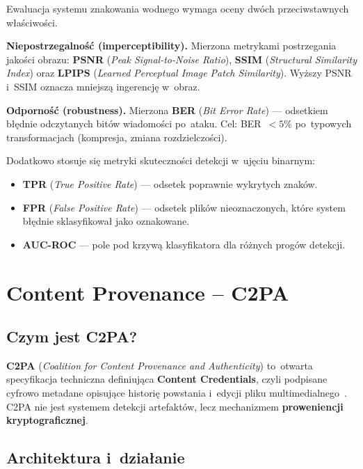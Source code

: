 Ewaluacja systemu znakowania wodnego wymaga oceny
dwóch przeciwstawnych w\l{}a\'{s}ciwo\'{s}ci.

\textbf{Niepostrzegalno\'{s}\'{c} (imperceptibility).}
Mierzona metrykami postrzegania jako\'{s}ci obrazu:
\textbf{PSNR} (\textit{Peak Signal-to-Noise Ratio}),
\textbf{SSIM} (\textit{Structural Similarity Index})
oraz \textbf{LPIPS} (\textit{Learned Perceptual Image Patch Similarity}).
Wy\.{z}szy PSNR i~SSIM oznacza mniejsz\k{a} ingerencj\k{e} w~obraz.

\textbf{Odporno\'{s}\'{c} (robustness).}
Mierzona \textbf{BER} (\textit{Bit Error Rate}) ---
odsetkiem b\l{}\k{e}dnie odczytanych bit\'{o}w wiadomo\'{s}ci po~ataku.
Cel: BER~$< 5\%$ po~typowych transformacjach
(kompresja, zmiana rozdzielczo\'{s}ci).

Dodatkowo stosuje si\k{e} metryki skuteczno\'{s}ci detekcji
w~uj\k{e}ciu binarnym:
\begin{itemize}
  \item \textbf{TPR} (\textit{True Positive Rate}) ---
        odsetek poprawnie wykrytych znak\'{o}w.
  \item \textbf{FPR} (\textit{False Positive Rate}) ---
        odsetek plik\'{o}w nieoznaczonych, kt\'{o}re system
        b\l{}\k{e}dnie sklasyfikowa\l{} jako oznakowane.
  \item \textbf{AUC-ROC} ---
        pole pod krzyw\k{a} klasyfikatora dla r\'{o}\.{z}nych
        prog\'{o}w detekcji.
\end{itemize}

\section{Content Provenance -- C2PA}
\label{sec:c2pa}

\subsection{Czym jest C2PA?}
\label{sec:c2pa_opis}

\textbf{C2PA} (\textit{Coalition for Content Provenance and Authenticity})
to~otwarta specyfikacja techniczna definiuj\k{a}ca
\textbf{Content Credentials}, czyli podpisane cyfrowo metadane opisuj\k{a}ce
histori\k{e} powstania i~edycji pliku multimedialnego~\cite{C2PA2024Spec}.
C2PA nie jest systemem detekcji artefakt\'{o}w, lecz mechanizmem
\textbf{proweniencji kryptograficznej}.

\subsection{Architektura i~dzia\l{}anie}
\label{sec:c2pa_architektura}

